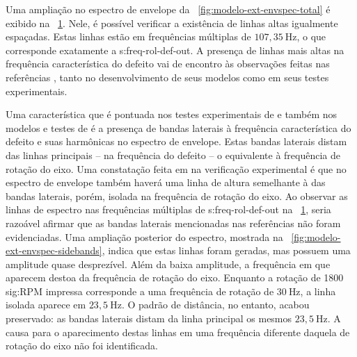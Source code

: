 \documentclass[12pt,oneside,english,brazil,lmodern,siglas,simbolos,cite=num]{ucsmonograph}
\begin{document}
	Uma ampliação no espectro de envelope da \figurename\ \ref{fig:modelo-ext-envspec-total} é exibido na \figurename\ \ref{fig:modelo-ext-envspec-600hz}.
	Nele, é possível verificar a existência de linhas altas igualmente espaçadas.
	Estas linhas estão em frequências múltiplas de $107,35\ \text{Hz}$, o que corresponde exatamente a \gls{s:freq-rol-def-out}.
	A presença de linhas mais altas na frequência característica do defeito vai de encontro às observações feitas nas referências \cite{mcfadden:1984,sassi:2007,patil:2010,cong:2013}, tanto no desenvolvimento de seus modelos como em seus testes experimentais.

	\begin{figure}[ht]
		\label{fig:modelo-ext-envspec-600hz}
	\end{figure}

	Uma característica que é pontuada nos testes experimentais de \cite{mcfadden:1984} e também nos modelos e testes de \cite{sassi:2007,cong:2013} é a presença de bandas laterais à frequência característica do defeito e suas harmônicas no espectro de envelope.
	Estas bandas laterais distam das linhas principais -- na frequência do defeito -- o equivalente à frequência de rotação do eixo.
	Uma constatação feita em \cite{mcfadden:1984} na verificação experimental é que no espectro de envelope também haverá uma linha de altura semelhante à das bandas laterais, porém, isolada na frequência de rotação do eixo.
	Ao observar as linhas de espectro nas frequências múltiplas de \gls{s:freq-rol-def-out} na \figurename\ \ref{fig:modelo-ext-envspec-600hz}, seria razoável afirmar que as bandas laterais mencionadas nas referências não foram evidenciadas.
	Uma ampliação posterior do espectro, mostrada na \figurename\ \ref{fig:modelo-ext-envspec-sidebands}, indica que estas linhas foram geradas, mas possuem uma amplitude quase desprezível.
	Além da baixa amplitude, a frequência em que aparecem destoa da frequência de rotação do eixo.
	Enquanto a rotação de 1800 \gls{sig:RPM} impressa corresponde a uma frequência de rotação de $30\ \text{Hz}$, a linha isolada aparece em $23,5\ \text{Hz}$.
	O padrão de distância, no entanto, acabou preservado: as bandas laterais distam da linha principal os mesmos $23,5\ \text{Hz}$.
	A causa para o aparecimento destas linhas em uma frequência diferente daquela de rotação do eixo não foi identificada.
\end{document}

